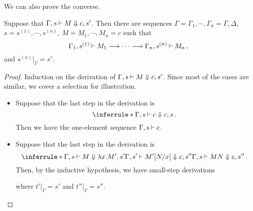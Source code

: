 \documentclass[11pt]{report}
\begin{document}
We can also prove the converse.

\begin{proposition}
  Suppose that $\Gamma,s\mathbin{\vdash} M\Downarrow c,s'$.  
  Then there are sequences $\Gamma=\Gamma_1,\cdots,\Gamma_n=\Gamma,\Delta$, $s=s^{(1)},\cdots,s^{(n)}$, $M=M_1,\cdots,M_n=c$ such that
  \[
    \Gamma_1,s^{(1)}\mathbin{\vdash} M_1 \longrightarrow \cdots \longrightarrow \Gamma_n,s^{(n)}\mathbin{\vdash} M_n\,,
    \]
  and $s^{(n)}\vert_{\Gamma}=s'$.
  \label{PropBigToSmall}
\end{proposition}
\begin{proof}
  Induction on the derivation of $\Gamma,s\mathbin{\vdash} M\Downarrow c,s'$.  
  Since most of the cases are similar, we cover a selection for illustration.

  \begin{itemize}
    \item Suppose that the last step in the derivation is
      \[
        \inferrule*{ }
        {\Gamma,s\ts c\converges c,s}\,.
        \]
      Then we have the one-element sequence $\Gamma,s\mathbin{\vdash} c$.  
    \item Suppose that the last step in the derivation is
      \[
        \inferrule*
        {
          \Gamma,s\ts M\converges \lambda x.M',s' \\ \Gamma,s' \ts M'[N/x]\converges c,s''
        }
        {
          \Gamma,s \ts MN\converges c,s''
        }\,.
        \]
      Then, by the inductive hypothesis, we have small-step derivations
      where $t'\vert_\Gamma=s'$ and $t''\vert_\Gamma=s''$.


\end{itemize}
\end{proof}
\end{document}
